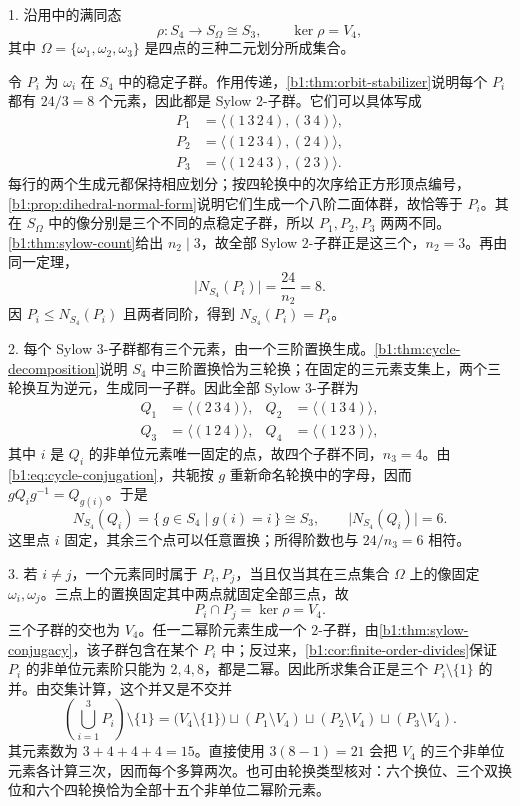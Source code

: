\begin{solution}
	1. 沿用中的满同态
	\[
		\rho:S_4\longrightarrow S_\Omega\cong S_3,\qquad \ker\rho=V_4,
	\]
	其中 \(\Omega=\{\omega_1,\omega_2,\omega_3\}\) 是四点的三种二元划分所成集合。

	令 \(P_i\) 为 \(\omega_i\) 在 \(S_4\) 中的稳定子群。作用传递，\cref{b1:thm:orbit-stabilizer}说明每个 \(P_i\) 都有 \(24/3=8\) 个元素，因此都是 Sylow \(2\)-子群。它们可以具体写成
	\[
		\begin{aligned}
			P_1&=\bigl\langle(1\,3\,2\,4),(3\,4)\bigr\rangle,\\
			P_2&=\bigl\langle(1\,2\,3\,4),(2\,4)\bigr\rangle,\\
			P_3&=\bigl\langle(1\,2\,4\,3),(2\,3)\bigr\rangle.
		\end{aligned}
	\]
	每行的两个生成元都保持相应划分；按四轮换中的次序给正方形顶点编号，\cref{b1:prop:dihedral-normal-form}说明它们生成一个八阶二面体群，故恰等于 \(P_i\)。其在 \(S_\Omega\) 中的像分别是三个不同的点稳定子群，所以 \(P_1,P_2,P_3\) 两两不同。\cref{b1:thm:sylow-count}给出 \(n_2\mid3\)，故全部 Sylow \(2\)-子群正是这三个，\(n_2=3\)。再由同一定理，
	\[
		\bigl|N_{S_4}(P_i)\bigr|=\frac{24}{n_2}=8.
	\]
	因 \(P_i\leq N_{S_4}(P_i)\) 且两者同阶，得到 \(N_{S_4}(P_i)=P_i\)。

	2. 每个 Sylow \(3\)-子群都有三个元素，由一个三阶置换生成。\cref{b1:thm:cycle-decomposition}说明 \(S_4\) 中三阶置换恰为三轮换；在固定的三元素支集上，两个三轮换互为逆元，生成同一子群。因此全部 Sylow \(3\)-子群为
	\[
		\begin{aligned}
			Q_1&=\bigl\langle(2\,3\,4)\bigr\rangle,& Q_2&=\bigl\langle(1\,3\,4)\bigr\rangle,\\
			Q_3&=\bigl\langle(1\,2\,4)\bigr\rangle,& Q_4&=\bigl\langle(1\,2\,3)\bigr\rangle,
		\end{aligned}
	\]
	其中 \(i\) 是 \(Q_i\) 的非单位元素唯一固定的点，故四个子群不同，\(n_3=4\)。由\eqref{b1:eq:cycle-conjugation}，共轭按 \(g\) 重新命名轮换中的字母，因而 \(gQ_ig^{-1}=Q_{g(i)}\)。于是
	\[
		N_{S_4}(Q_i)=\{\,g\in S_4\mid g(i)=i\,\}\cong S_3, \qquad \bigl|N_{S_4}(Q_i)\bigr|=6.
	\]
	这里点 \(i\) 固定，其余三个点可以任意置换；所得阶数也与 \(24/n_3=6\) 相符。

	3. 若 \(i\ne j\)，一个元素同时属于 \(P_i,P_j\)，当且仅当其在三点集合 \(\Omega\) 上的像固定 \(\omega_i,\omega_j\)。三点上的置换固定其中两点就固定全部三点，故
	\[
		P_i\cap P_j=\ker\rho=V_4.
	\]
	三个子群的交也为 \(V_4\)。任一二幂阶元素生成一个 \(2\)-子群，由\cref{b1:thm:sylow-conjugacy}，该子群包含在某个 \(P_i\) 中；反过来，\cref{b1:cor:finite-order-divides}保证 \(P_i\) 的非单位元素阶只能为 \(2,4,8\)，都是二幂。因此所求集合正是三个 \(P_i\setminus\{1\}\) 的并。由交集计算，这个并又是不交并
	\[
		\left(\bigcup_{i=1}^{3}P_i\right)\setminus\{1\} =\bigl(V_4\setminus\{1\}\bigr) \sqcup(P_1\setminus V_4) \sqcup(P_2\setminus V_4) \sqcup(P_3\setminus V_4).
	\]
	其元素数为 \(3+4+4+4=15\)。直接使用 \(3(8-1)=21\) 会把 \(V_4\) 的三个非单位元素各计算三次，因而每个多算两次。也可由轮换类型核对：六个换位、三个双换位和六个四轮换恰为全部十五个非单位二幂阶元素。
\end{solution}

